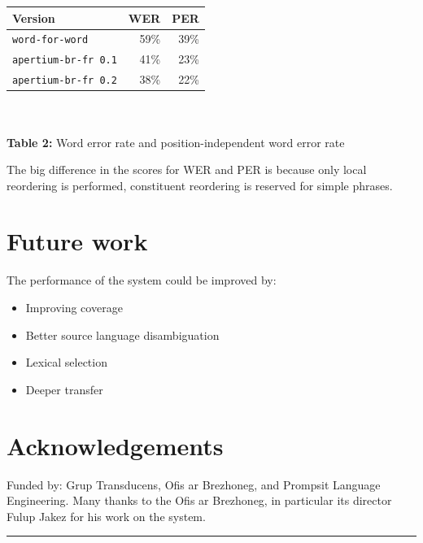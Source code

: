 \documentclass[a0,landscape]{a0poster}
\begin{document}
\begin{multicols}{4}
  \begin{center}
  \begin{tabular}{l|r|r}
   \hline
   {\bf Version }   & {\bf WER}  & {\bf PER}  \\
   \hline 
   \texttt{{\small word-for-word}} & 59\% & 39\% \\
   \texttt{{\small apertium-br-fr 0.1}}        & 41\% & 23\% \\
   \texttt{{\small apertium-br-fr 0.2}}        & 38\% & 22\% \\
   \hline
  \end{tabular}\\
~\\
    \textbf{Table 2:} Word error rate and position-independent word error rate 
  \end{center}
\vspace{0.5cm}
The big difference in the scores for WER and PER is because only 
local reordering is performed, constituent reordering is reserved for simple phrases.

\section{Future work}

\noindent
The performance of the system could be improved by:

\begin{itemize}
  \item Improving coverage 
  \item Better source language disambiguation
  \item Lexical selection
  \item Deeper transfer
\end{itemize}

\section*{Acknowledgements}

\noindent
Funded by: Grup Transducens, Ofis ar Brezhoneg, and Prompsit Language Engineering.
Many thanks to the Ofis ar Brezhoneg, in particular its director Fulup Jakez for his
work on the system. 

\flushright
\begin{minipage}[b]{0.8\linewidth}
\end{minipage}

\vskip 0.1cm
\hrule
\vskip 0.1cm

\end{multicols}
\end{document}
